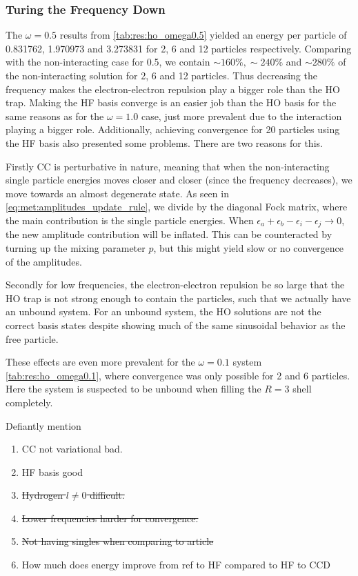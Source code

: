 \subsubsection{Turing the Frequency Down}
The $\omega = 0.5$ results from \cref{tab:res:ho_omega0.5} yielded an energy per particle of 0.831762, 1.970973 and 3.273831 for 2, 6 and 12 particles respectively. Comparing with the non-interacting case for 0.5, we contain $\sim 160\%,\sim 240\%$ and $\sim 280\%$ of the non-interacting solution for 2, 6 and 12 particles. Thus decreasing the frequency makes the electron-electron repulsion play a bigger role than the HO trap. Making the HF basis converge is an easier job than the HO basis for the same reasons as for the $\omega = 1.0$ case, just more prevalent due to the interaction playing a bigger role. Additionally, achieving convergence for 20 particles using the HF basis also presented some problems. There are two reasons for this.

Firstly CC is perturbative in nature, meaning that when the non-interacting single particle energies moves closer and closer (since the frequency decreases), we move towards an almost degenerate state. As seen in \cref{eq:met:amplitudes_update_rule}, we divide by the diagonal Fock matrix, where the main contribution is the single particle energies. When  $\epsilon_a + \epsilon_b - \epsilon_i - \epsilon_j \rightarrow 0$, the new amplitude contribution will be inflated. This can be counteracted by turning up the mixing parameter $p$, but this might yield slow or no convergence of the amplitudes.

Secondly for low frequencies, the electron-electron repulsion be so large that the HO trap is not strong enough to contain the particles, such that we actually have an unbound system. For an unbound system, the HO solutions are not the correct basis states despite showing much of the same sinusoidal behavior as the free particle.   

These effects are even more prevalent for the $\omega = 0.1$ system \cref{tab:res:ho_omega0.1}, where convergence was only possible for 2 and 6 particles. Here the system is suspected to be unbound when filling the $R=3$ shell completely.

Defiantly mention
\begin{enumerate}
    \item CC not variational bad.
    \item HF basis good
    \item \st{Hydrogen $l \neq 0$ difficult.}
    \item \st{Lower frequencies harder for convergence.}
    \item \st{Not having singles when comparing to article}
    \item How much does energy improve from ref to HF compared to HF to CCD
\end{enumerate} 


